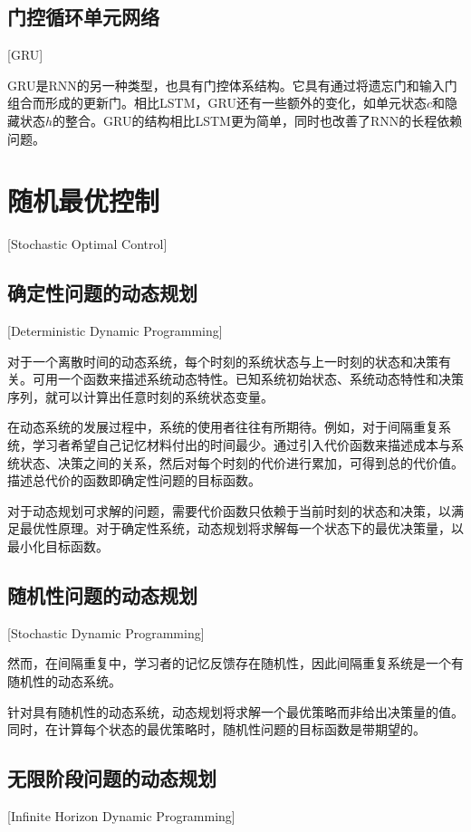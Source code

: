 \subsection{门控循环单元网络}[GRU]

GRU是RNN的另一种类型，也具有门控体系结构。它具有通过将遗忘门和输入门组合而形成的更新门。相比LSTM，GRU还有一些额外的变化，如单元状态$c$和隐藏状态$h$的整合。GRU的结构相比LSTM更为简单，同时也改善了RNN的长程依赖问题。

\section{随机最优控制}[Stochastic Optimal Control]

\subsection{确定性问题的动态规划}[Deterministic Dynamic Programming]

对于一个离散时间的动态系统，每个时刻的系统状态与上一时刻的状态和决策有关。可用一个函数来描述系统动态特性。已知系统初始状态、系统动态特性和决策序列，就可以计算出任意时刻的系统状态变量\cite[2-4]{bertsekasReinforcementLearningOptimal2019}。

在动态系统的发展过程中，系统的使用者往往有所期待。例如，对于间隔重复系统，学习者希望自己记忆材料付出的时间最少。通过引入代价函数来描述成本与系统状态、决策之间的关系，然后对每个时刻的代价进行累加，可得到总的代价值。描述总代价的函数即确定性问题的目标函数。

对于动态规划可求解的问题，需要代价函数只依赖于当前时刻的状态和决策，以满足最优性原理。对于确定性系统，动态规划将求解每一个状态下的最优决策量，以最小化目标函数。

\subsection{随机性问题的动态规划}[Stochastic Dynamic Programming]

然而，在间隔重复中，学习者的记忆反馈存在随机性，因此间隔重复系统是一个有随机性的动态系统。

针对具有随机性的动态系统，动态规划将求解一个最优策略而非给出决策量的值。同时，在计算每个状态的最优策略时，随机性问题的目标函数是带期望的\cite[14-16]{bertsekasReinforcementLearningOptimal2019}。

\subsection{无限阶段问题的动态规划}[Infinite Horizon Dynamic Programming]


